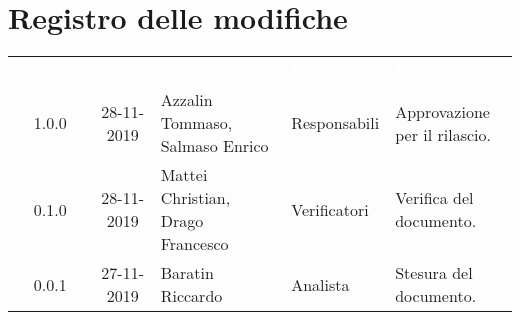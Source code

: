 \section*{Registro delle modifiche}
{
\renewcommand{\arraystretch}{1.5}
\centering
\begin{longtable}{ c c  C{4cm}  C{3cm} C{4cm}}
\textcolor{white}{\textbf{Versione}} & \textcolor{white}{\textbf{Data}} & \textcolor{white}{\textbf{Nominativo}} & \textcolor{white}{\textbf{Ruolo}} & \textcolor{white}{\textbf{Descrizione}}\\	


1.0.0 & 28-11-2019 & Azzalin Tommaso, Salmaso Enrico & Responsabili & Approvazione per il rilascio.  \\
		
0.1.0 & 28-11-2019 & Mattei Christian, Drago Francesco & Verificatori & Verifica del documento.  \\
		
0.0.1 & 27-11-2019 & Baratin Riccardo & Analista & Stesura del documento.  \\
		
		
\end{longtable}
}